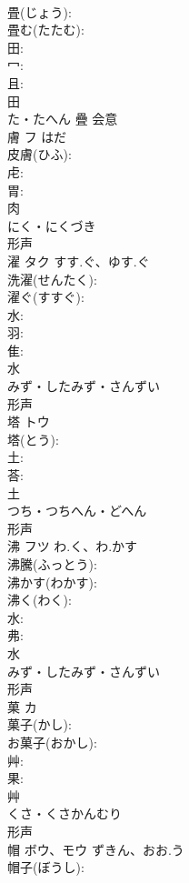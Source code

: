 \documentclass[8pt]{extreport}
\begin{document}
\begin{CJK}{UTF8}{min}
\\	畳(じょう): 
\\	畳む(たたむ): 
\\	田: 
\\	冖: 
\\	且: 
\\	田	
\\	た・たへん	疊	会意 
\\	膚	フ	はだ		
\\	皮膚(ひふ): 
\\	虍: 
\\	胃: 
\\	肉	
\\	にく・にくづき	
\\	形声 
\\	濯	タク	すす.ぐ、ゆす.ぐ		
\\	洗濯(せんたく): 
\\	濯ぐ(すすぐ): 
\\	水: 
\\	羽: 
\\	隹: 
\\	水	
\\	みず・したみず・さんずい	
\\	形声 
\\	塔	トウ			
\\	塔(とう): 
\\	土: 
\\	荅: 
\\	土	
\\	つち・つちへん・どへん	
\\	形声 
\\	沸	フツ	わ.く、わ.かす		
\\	沸騰(ふっとう): 
\\	沸かす(わかす): 
\\	沸く(わく): 
\\	水: 
\\	弗: 
\\	水	
\\	みず・したみず・さんずい	
\\	形声 
\\	菓	カ			
\\	菓子(かし): 
\\	お菓子(おかし): 
\\	艸: 
\\	果: 
\\	艸	
\\	くさ・くさかんむり	
\\	形声 
\\	帽	ボウ、モウ	ずきん、おお.う		
\\	帽子(ぼうし): 

\end{CJK}
\end{document}
